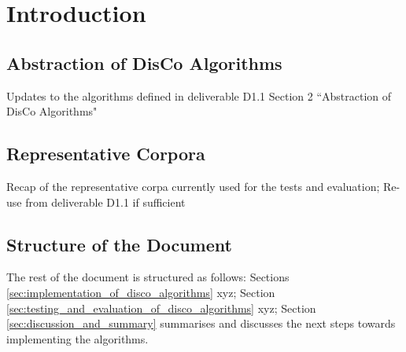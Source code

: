 \section{Introduction}
\label{sec:introduction}

\subsection{Abstraction of DisCo Algorithms}
\label{sec:abstraction_of_disco_algorithms}
Updates to the algorithms defined in deliverable D1.1 Section 2 ``Abstraction of DisCo Algorithms"

\subsection{Representative Corpora}
\label{sec:representative_corpora}
Recap of the representative corpa currently used for the tests and evaluation; Re-use from deliverable D1.1 if sufficient

\subsection{Structure of the Document}
The rest of the document is structured as follows: Sections \ref{sec:implementation_of_disco_algorithms} xyz; Section \ref{sec:testing_and_evaluation_of_disco_algorithms} xyz; Section \ref{sec:discussion_and_summary} summarises and discusses the next steps towards implementing the algorithms.